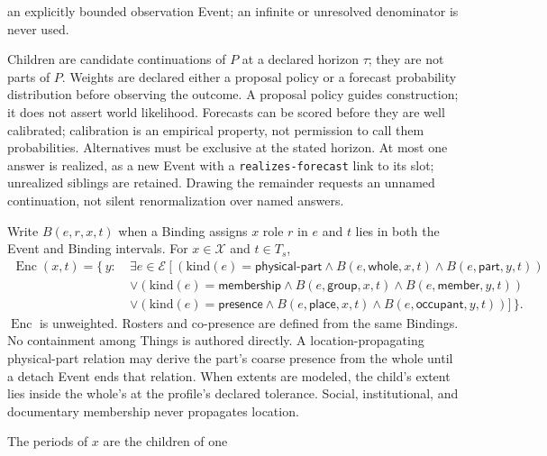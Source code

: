 \documentclass[11pt,a4paper]{article}
\newcommand{\Xset}{\mathcal X}
\newcommand{\Eset}{\mathcal E}
\begin{document}
\begin{description}
\begin{description}[leftmargin=1.2em]
        an explicitly bounded observation Event; an infinite or unresolved
        denominator is never used.
      \item[direction] Children are candidate continuations of $P$ at a
        declared horizon $\tau$; they are not parts of $P$. Weights are
        declared either a proposal policy or a forecast probability
        distribution before observing the outcome. A proposal policy guides
        construction; it does not assert world likelihood. Forecasts can be
        scored before they are well calibrated; calibration is an empirical
        property, not permission to call them probabilities. Alternatives
        must be exclusive at the stated horizon. At most one answer is
        realized, as a new Event with a \texttt{realizes-forecast} link to its slot;
        unrealized siblings are retained. Drawing the remainder requests an
        unnamed continuation, not silent renormalization over named answers.
    \end{description}
  \item[A7 Profile---Encapsulation and inherited presence.] Write
    $B(e,r,x,t)$ when a Binding assigns $x$ role $r$ in $e$ and $t$ lies in
    both the Event and Binding intervals. For $x\in\Xset$ and $t\in T_s$,
    \begin{equation}
    \begin{aligned}
      \operatorname{Enc}(x,t)=\bigl\{\,y:\ &\exists e\in\Eset\ [\
      (\mathrm{kind}(e)=\textsf{physical-part}\land B(e,\textsf{whole},x,t)\land B(e,\textsf{part},y,t))\\
      &\lor(\mathrm{kind}(e)=\textsf{membership}\land B(e,\textsf{group},x,t)\land B(e,\textsf{member},y,t))\\
      &\lor(\mathrm{kind}(e)=\textsf{presence}\land B(e,\textsf{place},x,t)\land B(e,\textsf{occupant},y,t))]\,\bigr\}.
    \end{aligned}
    \end{equation}
    $\operatorname{Enc}$ is unweighted. Rosters and co-presence are defined
    from the same Bindings. No containment among Things is authored directly.
    A location-propagating physical-part relation may derive the part's coarse
    presence from the whole until a detach Event ends that relation. When
    extents are modeled, the child's extent lies inside the whole's at the
    profile's declared tolerance. Social, institutional, and documentary
    membership never propagates location.
  \item[A8 Profile---Periods and episodes.] The periods of $x$ are the children of one

\end{description}
\end{document}
